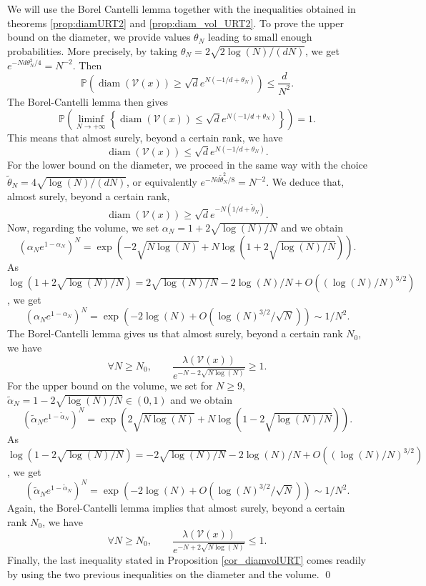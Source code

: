 \documentclass[paper=a4, fontsize=11pt]{scrartcl}
\newcommand{\diam}{\operatorname{diam}}
\newcommand{\PP}{\mathbb{P}}
\begin{document}
We will use the Borel Cantelli lemma together with the inequalities obtained in theorems \ref{prop:diamURT2} and \ref{prop:diam_vol_URT2}. To prove the upper bound on the diameter, we provide values $\theta_N$ leading to small enough probabilities. More precisely, by taking $\theta_N=2\sqrt{2\log(N)/(dN)}$, we get $e^{-Nd\theta_N^2/4}=N^{-2}$.   Then  
    \begin{equation*}
    \PP\left(\diam (\mathcal{V}(x))\geq \sqrt{d}e^{N(-1/d+\theta_N)}\right) \leq \dfrac{d}{N^2}.
\end{equation*} 
The Borel-Cantelli lemma then gives $$\PP\left(\liminf_{N \to + \infty} \left\{ \diam (\mathcal{V}(x)) \leq \sqrt{d} e^{N(-1/d + \theta_N)} \right\}\right) = 1.$$
This means that almost surely, beyond a certain rank, we have $$\diam (\mathcal{V}(x)) \leq \sqrt{d} e^{N(-1/d + \theta_N)}.$$
For the lower bound on the diameter, we proceed in the same way with the choice $\tilde \theta_N=4\sqrt{\log(N)/(dN)}$, or equivalently $e^{-Nd \tilde \theta_N^2/8}=N^{-2}$. We deduce that, almost surely, beyond a certain rank, $$\diam (\mathcal{V}(x)) \geq \sqrt{d} e^{-N(1/d + \tilde \theta_N)}.$$
Now, regarding the volume, we set $\alpha_N=1+2\sqrt{\log(N)/N}$ and we obtain \[
    \left(\alpha_N e^{1-\alpha_N}\right)^N = \exp\left( {-2\sqrt{N\log(N)}+N\log\left(1+2\sqrt{\log(N)/N}\right)}\right).\]
As $\log\left(1+2\sqrt{\log(N)/N}\right)=2\sqrt{\log(N)/N} - 2\log(N)/N+ O\left((\log(N)/N)^{3/2}\right)$, we get $$\left(\alpha_N e^{1-\alpha_N}\right)^N = \exp \left( -2\log(N) + O\left(\log(N)^{3/2} / \sqrt{N} \right) \right) \sim 1/N^2.$$
The Borel-Cantelli lemma gives us that almost surely, beyond a certain rank $N_0$, we have
$$\forall N \geq N_0, \qquad \frac{ \lambda(\mathcal{V}(x)) }{ e^{-N- 2\sqrt{N\log(N)}}} \geq 1.$$
For the upper bound on the volume, we set for $N \geq 9$, $\tilde \alpha_N=1 - 2\sqrt{\log(N)/N} \in (0,1)$ and we obtain \[
    \left(\tilde \alpha_N e^{1-\tilde \alpha_N}\right)^N = \exp\left( {2\sqrt{N\log(N)}+N\log\left(1-2\sqrt{\log(N)/N}\right)}\right).\]
As $\log\left(1-2\sqrt{\log(N)/N}\right)=-2\sqrt{\log(N)/N} - 2\log(N)/N+ O\left((\log(N)/N)^{3/2}\right)$, we get $$\left(\tilde \alpha_N e^{1-\tilde \alpha_N}\right)^N = \exp \left( -2\log(N) + O\left(\log(N)^{3/2} / \sqrt{N} \right) \right) \sim 1/N^2.$$
Again, the Borel-Cantelli lemma implies that almost surely, beyond a certain rank $N_0$, we have
$$\forall N \geq N_0, \qquad \frac{ \lambda(\mathcal{V}(x)) }{ e^{-N + 2\sqrt{N\log(N)}}} \leq 1.$$
Finally, the last inequality stated in Proposition \ref{cor_diamvolURT} comes readily by using the two previous inequalities on the diameter and the volume.
\qed
\end{document}
